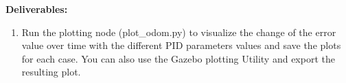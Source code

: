 \documentclass[12pt]{article}
\begin{document}
\textbf{Deliverables:}

\begin{enumerate}
    \item Run the plotting node (plot\_odom.py) to visualize the change of the error value over time with the different PID parameters values and save the plots for each case. You can also use the Gazebo plotting Utility and export the resulting plot.
    
    \begin{figure}[b]
    \centering
    
    \\


\end{figure}
\end{enumerate}
\end{document}
